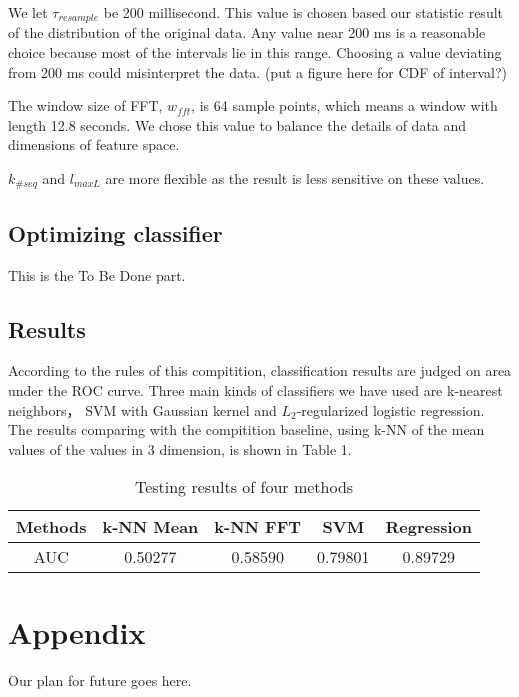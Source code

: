 \documentclass{article} %
\begin{document}
We let $\tau_{resample}$ be 200 millisecond. This value is chosen based our statistic result of the distribution of the original data. Any value near 200 ms is a reasonable choice because most of the intervals lie in this range. Choosing a value deviating from 200 ms could misinterpret the data. (put a figure here for CDF of interval?)

The window size of FFT, $w_{fft}$, is 64 sample points, which means a window with length 12.8 seconds. We chose this value to balance the details of data and dimensions of feature space. 

$k_{\#seq}$ and  $l_{maxL}$ are more flexible as the result is less sensitive on these values.

\subsection{Optimizing classifier}
This is the To Be Done part.

\subsection{Results}

According to the rules of this compitition, classification results are judged on area under the ROC curve. Three main kinds of classifiers we have used are k-nearest neighbors， SVM with Gaussian kernel and $L_2$-regularized logistic regression. The results comparing with the compitition baseline, using k-NN of the mean values of the values in 3 dimension, is shown in Table 1.

\begin{table}[!ht]
\caption{Testing results of four methods}
	\begin{center}
		\begin{tabular}{ c | c  c  c  c }
			\hline
			 Methods & k-NN Mean & k-NN FFT & SVM & Regression \\
			 \hline
			 AUC & 0.50277 & 0.58590 & 0.79801 & 0.89729 \\
			 \hline
		\end{tabular}
	\end{center}
\end{table}

\section*{Appendix}

Our plan for future goes here.
\end{document}
